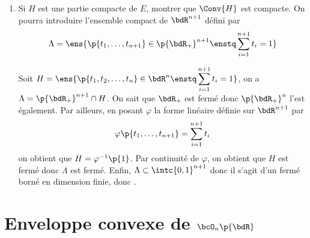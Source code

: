 \documentclass[a4paper,french,bookmarks]{article}
\begin{document}
\begin{enumerate}[resume]
        \item Si $H$ est une partie compacte de $E$, montrer que $\Conv{H}$ est compacte. On pourra introduire l'ensemble compact de $\bdR^{n+1}$ défini par
        \[ \Lambda = \ens{\p{t_1, \dots, t_{n+1}} \in \p{\bdR_+}^{n+1} \enstq \sum_{i=1}^{n+1} t_i = 1}\]
        
        \begin{lemma*}{}{}
                Soit $H = \ens{\p{t_1, t_2, \dots, t_n} \in \bdR^n \enstq \displaystyle\sum_{i=1}^{n+1} t_i = 1}$, on a $\Lambda = \p{\bdR_+}^{n+1} \cap H$. On sait que $\bdR_+$ est fermé donc $\p{\bdR_+}^n$ l'est également. Par ailleurs, en posant $\varphi$ la forme linéaire définie sur $\bdR^{n+1}$ par 
                \[ \varphi\p{t_1, \dots, t_{n+1}} = \sum_{i=1}^{n+1} t_i \]
                on obtient que $H = \varphi^{-1}\p{1}$. Par continuité de $\varphi$, on obtient que $H$ est fermé donc $\Lambda$ est fermé. Enfin, $\Lambda \subset \intc{0, 1}^{n+1}$ donc il s'agit d'un fermé borné en dimension finie, donc .
        \end{lemma*}
        
        \noafter
        \nobefore\yesafter
        \yesbefore
    \end{enumerate}
    
    \section{Enveloppe convexe de $\bcO_n\p{\bdR}$}
    
\end{document}
